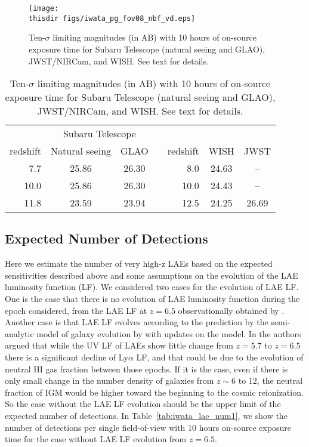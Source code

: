 \begin{figure}[!ht]
\centerline{
\texttt{[image: \\thisdir figs/iwata\_pg\_fov08\_nbf\_vd.eps]}
}
\caption{
Ten-$\sigma$ limiting magnitudes (in AB) with 10 hours of on-source
 exposure time for Subaru Telescope (natural seeing and GLAO),
 JWST/NIRCam, and WISH. See text for details.
}
\label{fig:iwata_nbf_sens}
\end{figure}

\begin{table}[!ht]
\begin{center}
\begin{tabular}{rccrrcc}
\hline
 & \multicolumn{2}{c}{Subaru Telescope} & \\
\cline{2-3}
 redshift & Natural seeing & GLAO & & redshift & WISH &
 JWST\\
\hline
 7.7 & 25.86 & 26.30 & & 8.0 & 24.63 & -- \\
 10.0 & 25.86 & 26.30 & & 10.0 & 24.43 & -- \\
 11.8 & 23.59 & 23.94 & & 12.5 & 24.25 & 26.69 \\
\hline
\end{tabular}
\end{center}
\caption{
Ten-$\sigma$ limiting magnitudes (in AB) with 10 hours of on-source
 exposure time for Subaru Telescope (natural seeing and GLAO),
 JWST/NIRCam, and WISH. See text for details.
}
\label{tab:iwata_nbf_sens}
\end{table}

\subsection{Expected Number of Detections}

Here we estimate the number of very high-z LAEs based on the expected
sensitivities described above and some assumptions on the evolution of
the LAE luminosity function (LF). 
We considered two cases for the evolution of LAE LF. 
One is the case that there is no evolution of LAE luminosity
function during the epoch considered, from the LAE LF at $z=6.5$
observationally obtained  by \citet{Kashikawa2011}.
Another case is that LAE LF evolves according to the prediction by the
semi-analytic model of galaxy evolution by \citet{Kobayashi2007,
Kobayashi2010} with updates on the model.
In \citet{Kashikawa2011} the authors argued that while the UV LF of LAEs
show little change from $z=5.7$ to $z=6.5$ there is a significant
decline of Ly$\alpha$ LF, and that could be due to the evolution of
neutral HI gas fraction between those epochs. If it is the case, even if
there is only small change in the number density of galaxies from 
$z\sim6$ to 12, the neutral fraction of IGM would be higher toward the
beginning to the cosmic reionization. So the case without the LAE LF
evolution should be the upper limit of the expected number of
detections. 
In Table~\ref{tab:iwata_lae_num1}, we show the number of detections per
single field-of-view with 10 hours on-source exposure time for the case
without LAE LF evolution from $z=6.5$.

